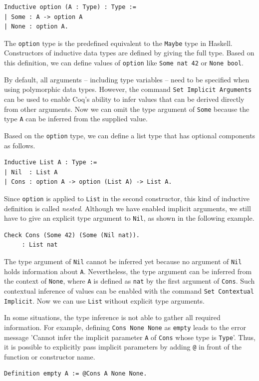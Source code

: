 \documentclass[a4paper, 11pt, fleqn, twoside]{scrreprt}
\newcommand{\hinl}[1]{\texttt{#1}}
\newcommand{\cinl}[1]{\texttt{#1}}
\begin{document}
\begin{verbatim}
Inductive option (A : Type) : Type := 
| Some : A -> option A 
| None : option A.
\end{verbatim}

The \cinl{option} type is the predefined equivalent to the \hinl{Maybe} type in Haskell.
Constructors of inductive data types are defined by giving the full type.
Based on this definition, we can define values of \cinl{option} like \cinl{Some nat 42} or \cinl{None bool}.

By default, all arguments -- including type variables -- need to be specified when using polymorphic data types.
However, the command \cinl{Set Implicit Arguments} can be used to enable Coq's ability to infer values that can be derived directly from other arguments.
Now we can omit the type argument of \cinl{Some} because the type \cinl{A} can be inferred from the supplied value.

Based on the \cinl{option} type, we can define a list type that has optional components as follows.
\begin{verbatim}
Inductive List A : Type :=
| Nil  : List A
| Cons : option A -> option (List A) -> List A.
\end{verbatim}

Since \cinl{option} is applied to \cinl{List} in the second constructor, this kind of inductive definition is called \textit{nested}.
Although we have enabled implicit arguments, we still have to give an explicit type argument to \cinl{Nil}, as shown in the following example.

\begin{verbatim}
Check Cons (Some 42) (Some (Nil nat)).
     : List nat
\end{verbatim}

The type argument of \cinl{Nil} cannot be inferred yet because no argument of \cinl{Nil} holds information about \cinl{A}.
Nevertheless, the type argument can be inferred from the context of \cinl{None}, where \cinl{A} is defined as \cinl{nat} by the first argument of \cinl{Cons}.
Such contextual inference of values can be enabled with the command \cinl{Set Contextual Implicit}.
Now we can use \cinl{List} without explicit type arguments.

In some situations, the type inference is not able to gather all required information.
For example, defining \cinl{Cons None None} as \cinl{empty} leads to the error message 'Cannot infer the implicit parameter \cinl{A} of \cinl{Cons} whose type is \cinl{Type}'.
Thus, it is possible to explicitly pass implicit parameters by adding \cinl{@} in front of the function or constructor name.
\begin{verbatim}
Definition empty A := @Cons A None None.
\end{verbatim}
\end{document}
